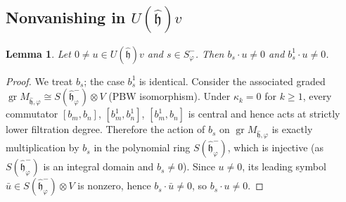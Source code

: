 \documentclass{amsart}
\DeclareMathOperator{\gr}{gr}
\newcommand{\h}{\mathfrak{h}}
\newcommand{\wh}[1]{\widehat{#1}}
\newcommand{\whh}{\wh{\h}}
\newtheorem{lemma}[theorem]{Lemma}
\theoremstyle{definition}
\theoremstyle{remark}
\numberwithin{equation}{section}
\begin{document}
\subsection{Nonvanishing in $U(\whh)v$}
\begin{lemma}\label{lem:nonvanish-Heis-mult}
Let $0\neq u\in U(\whh)v$ and $s\in S_\varphi^-$.
Then $b_s\cdot u\neq0$ and $b_s^1\cdot u\neq0$.
\end{lemma}
\begin{proof}
We treat $b_s$; the case $b_s^1$ is identical.  Consider the
associated graded
$\gr M_{\whh,\varphi}\cong S(\whh_\varphi^-)\otimes V$
(PBW isomorphism).  Under $\kappa_k=0$ for $k\ge1$, every commutator
$[b_m,b_n]$, $[b_m^1,b_n^1]$, $[b_m^1,b_n]$ is central and hence
acts at strictly lower filtration degree.  Therefore the action of
$b_s$ on $\gr M_{\whh,\varphi}$ is exactly multiplication by $b_s$
in the polynomial ring $S(\whh_\varphi^-)$, which is injective
(as $S(\whh_\varphi^-)$ is an integral domain and $b_s\neq0$).
Since $u\neq0$, its leading symbol $\bar u\in S(\whh_\varphi^-)\otimes V$
is nonzero, hence $b_s\cdot\bar u\neq0$, so $b_s\cdot u\neq0$.
\end{proof}
\end{document}
